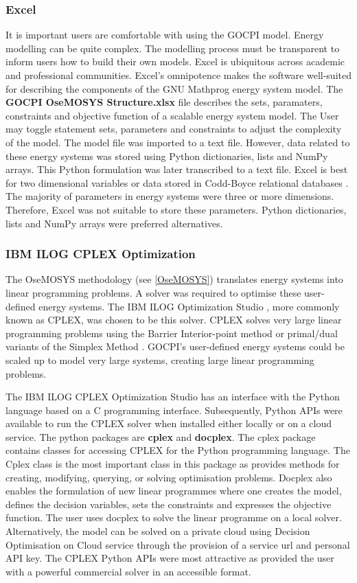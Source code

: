 \documentclass[12pt]{article}
\begin{document}
\subsubsection{Excel}
It is important users are comfortable with using the GOCPI model. 
Energy modelling can be quite complex. The modelling process must be transparent to inform users how to build their own models.
Excel is ubiquitous across academic and professional communities.
Excel's omnipotence makes the software well-suited for describing the components of the GNU Mathprog energy system model.
The \textbf{GOCPI OseMOSYS Structure.xlsx} file describes the sets, paramaters, constraints and objective function of a scalable energy system model.
The User may toggle statement sets, parameters and constraints to adjust the complexity of the model. 
The model file was imported to a text file.
However, data related to these energy systems was stored using Python dictionaries, lists and NumPy arrays.
This Python formulation was later transcribed to a text file.
Excel is best for two dimensional variables or data stored in Codd-Boyce relational databases \cite{CBNF}.
The majority of parameters in energy systems were three or more dimensions. 
Therefore, Excel was not suitable to store these parameters.
Python dictionaries, lists and NumPy arrays were preferred alternatives.

\subsubsection{IBM ILOG CPLEX Optimization}
The OseMOSYS methodology (see \ref{OseMOSYS}) translates energy systems into linear programming problems. 
A solver was required to optimise these user-defined energy systems.
The IBM ILOG Optimization Studio \cite{IBM_ILOG}, more commonly known as CPLEX, was chosen to be this solver.
CPLEX solves very large linear programming problems using the Barrier Interior-point method \cite{IPM} or primal/dual variants of the Simplex Method \cite{Simplex}.
GOCPI's user-defined energy systems could be scaled up to model very large systems, creating large linear programming problems.

The IBM ILOG CPLEX Optimization Studio has an interface with the Python language based on a C programming interface.
Subsequently, Python APIs were available to run the CPLEX solver when installed either locally or on a cloud service.
The python packages are \textbf{cplex} and \textbf{docplex}. The cplex package contains classes for accessing CPLEX for the Python programming language. 
The Cplex class is the most important class in this package as provides methods for creating, modifying, querying, or solving optimisation problems.
Docplex also enables the formulation of new linear programmes where one creates the model, defines the decision variables, sets the constraints and expresses the objective function.
The user uses docplex to solve the linear programme on a local solver. 
Alternatively, the model can be solved on a private cloud using Decision Optimisation on Cloud service through the provision of a service url and personal API key.
The CPLEX Python APIs were most attractive as provided the user with a powerful commercial solver in an accessible format.
\end{document}
